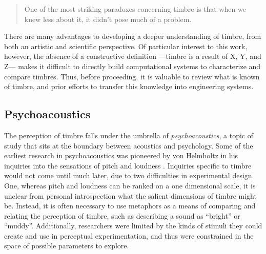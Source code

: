 \begin{quote}
One of the most striking paradoxes concerning timbre is that when we knew less about it, it didn’t pose much of a problem.
\end{quote}

There are many advantages to developing a deeper understanding of timbre, from both an artistic and scientific perspective.
Of particular interest to this work, however, the absence of a constructive definition ---timbre is a result of X, Y, and Z--- makes it difficult to directly build computational systems to characterize and compare timbres.
Thus, before proceeding, it is valuable to review what is known of timbre, and prior efforts to transfer this knowledge into engineering systems.


\subsection{Psychoacoustics}
The perception of timbre falls under the umbrella of \emph{psychoacoustics}, a topic of study that sits at the boundary between acoustics and psychology.
Some of the earliest research in psychoacoustics was pioneered by von Helmholtz in his inquiries into the sensations of pitch and loudness \cite{Bregman1994Auditory}.
Inquiries specific to timbre would not come until much later, due to two difficulties in experimental design.
One, whereas pitch and loudness can be ranked on a one dimensional scale, it is unclear from personal introspection what the salient dimensions of timbre might be.
Instead, it is often necessary to use metaphors as a means of comparing and relating the perception of timbre, such as describing a sound as ``bright'' or ``muddy''.
Additionally, researchers were limited by the kinds of stimuli they could create and use in perceptual experimentation, and thus were constrained in the space of possible parameters to explore.

